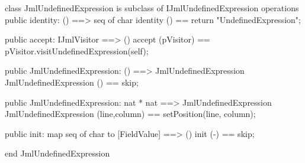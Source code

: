 \begin{vdm_al}
class JmlUndefinedExpression is subclass of IJmlUndefinedExpression
operations
  public identity: () ==> seq of char
  identity () == return "UndefinedExpression";

  public accept: IJmlVisitor ==> ()
  accept (pVisitor) == pVisitor.visitUndefinedExpression(self);

  public JmlUndefinedExpression:
    () ==> JmlUndefinedExpression
  JmlUndefinedExpression () == 
    skip;

  public JmlUndefinedExpression:
    nat *
    nat ==> JmlUndefinedExpression
  JmlUndefinedExpression (line,column) == 
    setPosition(line, column);

  public init: map seq of char to [FieldValue] ==> ()
  init (-) == skip;

end JmlUndefinedExpression
\end{vdm_al}

